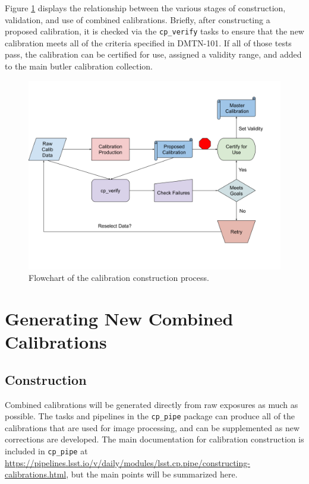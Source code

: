 \documentclass[DM,authoryear,toc]{lsstdoc}
\begin{document}
Figure \ref{fig:flowchart} displays the relationship between the various stages of construction, validation, and use of combined calibrations.  Briefly, after constructing a proposed calibration, it is checked via the \verb|cp_verify| tasks to ensure that the new calibration meets all of the criteria specified in DMTN-101.  If all of those tests pass, the calibration can be certified for use, assigned a validity range, and added to the main butler calibration collection.

\begin{figure}
  \includegraphics[width=\linewidth]{figures/flowchart.png}
  \caption{Flowchart of the calibration construction process.}
  \label{fig:flowchart}
\end{figure}


\section{Generating New Combined Calibrations}

\subsection{Construction}

Combined calibrations will be generated directly from raw exposures as much as possible.  The tasks and pipelines in the \verb|cp_pipe| package can produce all of the calibrations that are used for image processing, and can be supplemented as new corrections are developed.  The main documentation for calibration construction is included in \verb|cp_pipe| at \url{https://pipelines.lsst.io/v/daily/modules/lsst.cp.pipe/constructing-calibrations.html}, but the main points will be summarized here.
\end{document}
